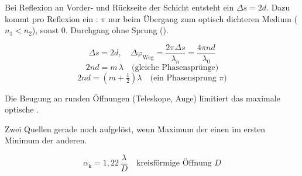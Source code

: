 \ZSFmanualColumnBreak
{}
\begin{runintext}
Bei Reflexion an Vorder- und Rückseite der Schicht entsteht ein  $\Delta s=2d$. Dazu kommt pro Reflexion ein : $\pi$ nur beim Übergang zum optisch dichteren Medium ($n_1<n_2$), sonst $0$. Durchgang ohne Sprung ().
\end{runintext}
\begin{formulabox}
\[ \Delta s = 2d, \quad \Delta\varphi_{\text{Weg}} = \frac{2\pi \Delta s}{\lambda_n} = \frac{4\pi nd}{\lambda_0} \]
\formulasep
\[ 2nd = m\,\lambda \quad \text{(gleiche Phasensprünge)} \]
\[ 2nd = \left(m+\tfrac{1}{2}\right)\lambda \quad \text{(ein Phasensprung $\pi$)} \]
\end{formulabox}


\begin{runintext}
Die Beugung an runden Öffnungen (Teleskope, Auge) limitiert das maximale optische .
\end{runintext}
\begin{runintext}
Zwei Quellen gerade noch aufgelöst, wenn Maximum der einen im ersten Minimum der anderen.
\end{runintext}
\begin{formulabox}
\[ \alpha_{\mathrm{k}} = 1{,}22\,\frac{\lambda}{D} \quad \text{kreisförmige Öffnung $D$} \]
\end{formulabox}

